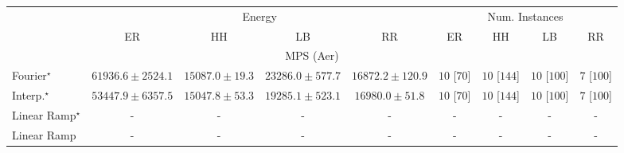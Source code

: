 \begin{tabular}{l|cccc|cccc|}
\toprule
& \multicolumn{4}{c|}{Energy} & \multicolumn{4}{c|}{Num. Instances} \\
            & ER & HH & LB & RR & ER & HH & LB & RR \\
\midrule
\multicolumn{9}{c}{\rule{0pt}{8pt}MPS (Aer)} \\
\midrule
Fourier$^\star$ & {\cellcolor[HTML]{6A0867}} \color[HTML]{F1F1F1} $61936.6\pm 2524.1$ & {\cellcolor[HTML]{E7F1F7}} \color[HTML]{000000} $15087.0\pm 19.3$ & {\cellcolor[HTML]{C3D6E8}} \color[HTML]{000000} $23286.0\pm 577.7$ & {\cellcolor[HTML]{E1EDF5}} \color[HTML]{000000} $16872.2\pm 120.9$ & {\cellcolor[HTML]{49006A}} \color[HTML]{F1F1F1} $10$ [$70$] & {\cellcolor[HTML]{49006A}} \color[HTML]{F1F1F1} $10$ [$144$] & {\cellcolor[HTML]{49006A}} \color[HTML]{F1F1F1} $10$ [$100$] & {\cellcolor[HTML]{CD238F}} \color[HTML]{F1F1F1} $7$ [$100$] \\
Interp.$^\star$ & {\cellcolor[HTML]{873696}} \color[HTML]{F1F1F1} $53447.9\pm 6357.5$ & {\cellcolor[HTML]{E7F1F7}} \color[HTML]{000000} $15047.8\pm 53.3$ & {\cellcolor[HTML]{D7E5F0}} \color[HTML]{000000} $19285.1\pm 523.1$ & {\cellcolor[HTML]{E1ECF4}} \color[HTML]{000000} $16980.0\pm 51.8$ & {\cellcolor[HTML]{49006A}} \color[HTML]{F1F1F1} $10$ [$70$] & {\cellcolor[HTML]{49006A}} \color[HTML]{F1F1F1} $10$ [$144$] & {\cellcolor[HTML]{49006A}} \color[HTML]{F1F1F1} $10$ [$100$] & {\cellcolor[HTML]{CD238F}} \color[HTML]{F1F1F1} $7$ [$100$] \\
Linear Ramp$^\star$ & {\cellcolor[HTML]{000000}} \color[HTML]{F1F1F1} {\cellcolor{white}} \color{black} - & {\cellcolor[HTML]{000000}} \color[HTML]{F1F1F1} {\cellcolor{white}} \color{black} - & {\cellcolor[HTML]{000000}} \color[HTML]{F1F1F1} {\cellcolor{white}} \color{black} - & {\cellcolor[HTML]{000000}} \color[HTML]{F1F1F1} {\cellcolor{white}} \color{black} - & {\cellcolor[HTML]{000000}} \color[HTML]{F1F1F1} {\cellcolor{white}} \color{black} - & {\cellcolor[HTML]{000000}} \color[HTML]{F1F1F1} {\cellcolor{white}} \color{black} - & {\cellcolor[HTML]{000000}} \color[HTML]{F1F1F1} {\cellcolor{white}} \color{black} - & {\cellcolor[HTML]{000000}} \color[HTML]{F1F1F1} {\cellcolor{white}} \color{black} - \\
Linear Ramp & {\cellcolor[HTML]{000000}} \color[HTML]{F1F1F1} {\cellcolor{white}} \color{black} - & {\cellcolor[HTML]{000000}} \color[HTML]{F1F1F1} {\cellcolor{white}} \color{black} - & {\cellcolor[HTML]{000000}} \color[HTML]{F1F1F1} {\cellcolor{white}} \color{black} - & {\cellcolor[HTML]{000000}} \color[HTML]{F1F1F1} {\cellcolor{white}} \color{black} - & {\cellcolor[HTML]{000000}} \color[HTML]{F1F1F1} {\cellcolor{white}} \color{black} - & {\cellcolor[HTML]{000000}} \color[HTML]{F1F1F1} {\cellcolor{white}} \color{black} - & {\cellcolor[HTML]{000000}} \color[HTML]{F1F1F1} {\cellcolor{white}} \color{black} - & {\cellcolor[HTML]{000000}} \color[HTML]{F1F1F1} {\cellcolor{white}} \color{black} - \\

\end{tabular}
